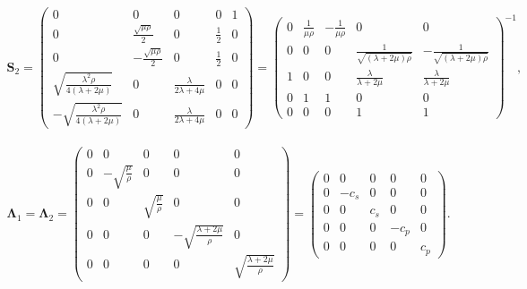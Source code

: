 \begin{gather*}
    \pmb{S}_2 = 
    \begin{pmatrix}
        0 & 0 & 0 & 0 & 1 \\
        0 & \frac{\sqrt{\mu\rho}}{2} & 0 & \frac{1}{2} & 0 \\
        0 & -\frac{\sqrt{\mu\rho}}{2} & 0 & \frac{1}{2} & 0 \\
        \sqrt{\frac{\lambda^2 \rho}{4\left(\lambda+2\mu\right)}} & 0 & \frac{\lambda}{2\lambda + 4\mu} & 0 & 0 \\
        -\sqrt{\frac{\lambda^2 \rho}{4\left(\lambda+2\mu\right)}} & 0 & \frac{\lambda}{2\lambda + 4\mu} & 0 & 0
    \end{pmatrix}
    =
    \begin{pmatrix}
        0 & \frac{1}{\mu\rho} & -\frac{1}{\mu\rho} & 0 & 0 \\
        0 & 0 & 0 & \frac{1}{\sqrt{\left(\lambda+2\mu\right)\rho}} & -\frac{1}{\sqrt{\left(\lambda+2\mu\right)\rho}} \\
        1 & 0 & 0 & \frac{\lambda}{\lambda+2\mu} & \frac{\lambda}{\lambda+2\mu} \\
        0 & 1 & 1 & 0 & 0 \\
        0 & 0 & 0 & 1 & 1
    \end{pmatrix}^{-1}
    ,
\end{gather*}

\begin{gather*}
    \pmb{\Lambda}_1 = \pmb{\Lambda}_2 = 
    \begin{pmatrix}
        0 & 0 & 0 & 0 & 0\\
        0 & -\sqrt{\frac{\mu}{\rho}} & 0 & 0 & 0\\
        0 & 0 & \sqrt{\frac{\mu}{\rho}} & 0 & 0\\
        0 & 0 & 0 & -\sqrt{\frac{\lambda + 2\mu}{\rho}} & 0\\
        0 & 0 & 0 & 0 & \sqrt{\frac{\lambda + 2\mu}{\rho}}
    \end{pmatrix} = 
    \begin{pmatrix}
        0 & 0 & 0 & 0 & 0 \\
        0 & -c_s & 0 & 0 & 0 \\
        0 & 0 & c_s & 0 & 0 \\
        0 & 0 & 0 & -c_p & 0 \\
        0 & 0 & 0 & 0 & c_p
    \end{pmatrix}
    .
\end{gather*}

